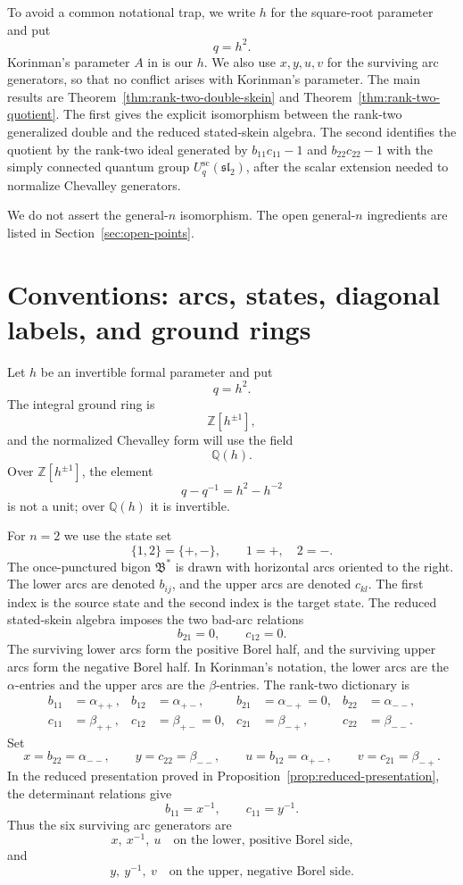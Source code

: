 \documentclass[12pt]{article}
\theoremstyle{plain}
\theoremstyle{definition}
\numberwithin{equation}{section}
\newcommand{\Ring}{\mathbb{Z}[h^{\pm 1}]}
\newcommand{\Field}{\mathbb{Q}(h)}
\newcommand{\bigon}{\mathfrak{B}^{*}}
\newcommand{\Uqsc}{U_q^{\mathrm{sc}}(\mathfrak{sl}_2)}
\begin{document}
To avoid a common notational trap, we write \(h\) for the square-root parameter and put
\[
q=h^2.
\]
Korinman's parameter \(A\) in \cite{Korinman} is our \(h\).  We also use \(x,y,u,v\) for the surviving arc generators, so that no conflict arises with Korinman's parameter.
The main results are Theorem~\ref{thm:rank-two-double-skein} and Theorem~\ref{thm:rank-two-quotient}.  The first gives the explicit isomorphism between the rank-two generalized double and the reduced stated-skein algebra.  The second identifies the quotient by the rank-two ideal generated by \(b_{11}c_{11}-1\) and \(b_{22}c_{22}-1\) with the simply connected quantum group \(\Uqsc\), after the scalar extension needed to normalize Chevalley generators.

We do not assert the general-\(n\) isomorphism.  The open general-\(n\) ingredients are listed in Section~\ref{sec:open-points}.

\section{Conventions: arcs, states, diagonal labels, and ground rings}
\label{sec:conventions}

Let \(h\) be an invertible formal parameter and put
\[
q=h^2.
\]
The integral ground ring is
\[
\Ring,
\]
and the normalized Chevalley form will use the field
\[
\Field.
\]
Over \(\Ring\), the element
\[
q-q^{-1}=h^2-h^{-2}
\]
is not a unit; over \(\Field\) it is invertible.

For \(n=2\) we use the state set
\[
\{1,2\}=\{+,-\},
\qquad
1=+,
\quad
2=-.
\]
The once-punctured bigon \(\bigon\) is drawn with horizontal arcs oriented to the right.  The lower arcs are denoted \(b_{ij}\), and the upper arcs are denoted \(c_{kl}\).  The first index is the source state and the second index is the target state.
The reduced stated-skein algebra imposes the two bad-arc relations
\[
b_{21}=0,
\qquad
c_{12}=0.
\]
The surviving lower arcs form the positive Borel half, and the surviving upper arcs form the negative Borel half.  In Korinman's notation, the lower arcs are the \(\alpha\)-entries and the upper arcs are the \(\beta\)-entries.  The rank-two dictionary is
\[
\begin{aligned}
b_{11}&=\alpha_{++}, & b_{12}&=\alpha_{+-}, & b_{21}&=\alpha_{-+}=0, & b_{22}&=\alpha_{--},\\
c_{11}&=\beta_{++}, & c_{12}&=\beta_{+-}=0, & c_{21}&=\beta_{-+}, & c_{22}&=\beta_{--}.
\end{aligned}
\]
Set
\[
x=b_{22}=\alpha_{--},
\qquad
y=c_{22}=\beta_{--},
\qquad
u=b_{12}=\alpha_{+-},
\qquad
v=c_{21}=\beta_{-+}.
\]
In the reduced presentation proved in Proposition~\ref{prop:reduced-presentation}, the determinant relations give
\[
b_{11}=x^{-1},
\qquad
c_{11}=y^{-1}.
\]
Thus the six surviving arc generators are
\[
x,\ x^{-1},\ u
\quad\text{on the lower, positive Borel side,}
\]
and
\[
y,\ y^{-1},\ v
\quad\text{on the upper, negative Borel side.}
\]
\end{document}
